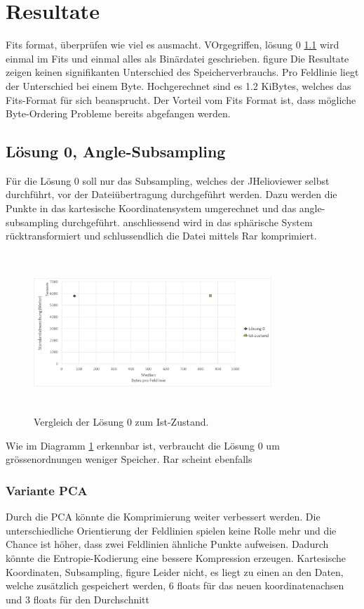 \section{Resultate}\label{resultate}

Fits format, überprüfen wie viel es ausmacht. VOrgegriffen, lösung 0 \ref{resultate:loesung0} wird einmal im Fits und einmal alles als Binärdatei geschrieben.
figure
Die Resultate zeigen keinen signifikanten Unterschied des Speicherverbrauchs. Pro Feldlinie liegt der Unterschied bei einem Byte. Hochgerechnet sind es 1.2 KiBytes, welches das Fits-Format für sich beansprucht. Der Vorteil vom Fits Format ist, dass mögliche Byte-Ordering Probleme bereits abgefangen werden.

\subsection{Lösung 0, Angle-Subsampling} \label{resultate:loesung0}
Für die Lösung 0 soll nur das Subsampling, welches der JHelioviewer selbst durchführt, vor der Dateiübertragung durchgeführt werden. Dazu werden die Punkte in das kartesische Koordinatensystem umgerechnet und das angle-subsampling durchgeführt. anschliessend wird in das sphärische System rücktransformiert und schlussendlich die Datei mittels Rar komprimiert.
\begin{figure}[!htbp]
	\center
	\includegraphics[width=0.8\textwidth,height=6cm,keepaspectratio]{./pictures/resultate/loesung0/loesung0_0.png}
	\caption{Vergleich der Lösung 0 zum Ist-Zustand.}
	\label{resultate:loesung0:loesung0_0}
\end{figure}
Wie im Diagramm \ref{resultate:loesung0:loesung0_0} erkennbar ist, verbraucht die Lösung 0 um grössenordnungen weniger Speicher. Rar scheint ebenfalls

\subsubsection{Variante PCA}
Durch die PCA könnte die Komprimierung weiter verbessert werden. Die unterschiedliche Orientierung der Feldlinien spielen keine Rolle mehr und die Chance ist höher, dass zwei Feldlinien ähnliche Punkte aufweisen. Dadurch könnte die Entropie-Kodierung eine bessere Kompression erzeugen.
Kartesische Koordinaten, Subsampling, 
figure
Leider nicht, es liegt zu einen an den Daten, welche zusätzlich gespeichert werden, 6 floats für das neuen koordinatenachsen und 3 floats für den Durchschnitt


